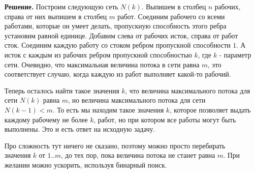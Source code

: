 \begin{enumerate}
	\textbf{Решение.} Построим следующую сеть $N(k)$. Выпишем в столбец $n$ рабочих, справа от них выпишем в 
	столбец $m$ работ. Соединим рабочего со всеми работами, которые он умеет делать, пропускную способность 
	этого ребра установим равной единице. Добавим слева от рабочих исток, справа от работ сток. Соединим каждую 
	работу со стоком ребром пропускной способности $1$. А исток с каждым из рабочих ребром пропускной 
	способностью $k$, где $k$ - параметр сети. Очевидно, что максимальная величина потока в сети равна $m$, это 
	соответствует случаю, когда каждую из работ выполняет какой-то рабочий.
	
	Теперь осталось найти такое значения $k$, что величина максимального потока для сети $N(k)$ равна $m$, но 
	величина максимального потока для сети $N(k - 1) < m$. То есть мы находим такое значения $k$, которое 
	позволяет выдать каждому рабочему не более $k$, работ, но при котором все работы могут быть выполнены. Это и 
	есть ответ на исходную задачу.
	
	Про сложность тут ничего не сказано, поэтому можно просто перебирать значения $k$ от $1..m$, до тех пор, 
	пока величина потока не станет равна $m$. При желании можно ускорить, используя бинарный поиск.
\end{enumerate}

